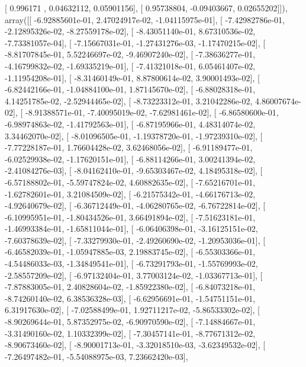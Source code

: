 \documentclass{article}
\begin{document}
       [ 0.996171  ,  0.04632112,  0.05901156],
       [ 0.95738804, -0.09403667,  0.02655202]]), array([[ -6.92885601e-01,   2.47024917e-02,  -1.04115975e-01],
       [ -7.42982786e-01,  -2.12895326e-02,  -8.27559178e-02],
       [ -8.43051140e-01,   8.67310536e-02,  -7.73381057e-04],
       [ -7.15667031e-01,  -1.27431276e-03,  -1.17470215e-02],
       [ -8.81707845e-01,   5.52246697e-02,  -9.46907240e-02],
       [ -7.38636277e-01,  -4.16799832e-02,  -1.69335219e-01],
       [ -7.41321018e-01,   6.05461407e-02,  -1.11954208e-01],
       [ -8.31460149e-01,   8.87800614e-02,   3.90001493e-02],
       [ -6.82442166e-01,  -1.04884100e-01,   1.87145670e-02],
       [ -6.88028318e-01,   4.14251785e-02,  -2.52944465e-02],
       [ -8.73223312e-01,   3.21042286e-02,   4.86007674e-02],
       [ -8.91388571e-01,  -7.40095019e-02,  -7.62981461e-02],
       [ -6.86580600e-01,  -6.98974863e-02,  -1.41792563e-01],
       [ -6.87195966e-01,   4.48314074e-02,   3.34462070e-02],
       [ -8.01096505e-01,  -1.19378720e-01,  -1.97239310e-02],
       [ -7.77228187e-01,   1.76604428e-02,   3.62468056e-02],
       [ -6.91189477e-01,  -6.02529938e-02,  -1.17620151e-01],
       [ -6.88114266e-01,   3.00241394e-02,  -2.41084276e-03],
       [ -8.04162410e-01,  -9.65303467e-02,   4.18495318e-02],
       [ -6.57188802e-01,  -5.59747824e-02,   4.60882635e-02],
       [ -7.65216701e-01,  -1.62782601e-01,   3.21084509e-02],
       [ -6.21575342e-01,  -4.66176713e-02,  -4.92640679e-02],
       [ -6.36712449e-01,  -4.06280765e-02,  -6.76722814e-02],
       [ -6.10995951e-01,  -1.80434526e-01,   3.66491894e-02],
       [ -7.51623181e-01,  -1.46993384e-01,  -1.65811044e-01],
       [ -6.06406398e-01,  -3.16125151e-02,  -7.60378639e-02],
       [ -7.33279930e-01,  -2.49260690e-02,  -1.20953036e-01],
       [ -6.46582039e-01,  -1.05947885e-03,   2.19883745e-02],
       [ -6.55303366e-01,  -4.54486033e-03,  -1.34849541e-01],
       [ -6.73291793e-01,  -1.55769993e-02,  -2.58557209e-02],
       [ -6.97132404e-01,   3.77003124e-02,  -1.03367713e-01],
       [ -7.87883005e-01,   2.40828604e-02,  -1.85922380e-02],
       [ -6.84073218e-01,  -8.74260140e-02,   6.38536328e-03],
       [ -6.62956691e-01,  -1.54751151e-01,   6.31917630e-02],
       [ -7.02588499e-01,   1.92711217e-02,  -5.86533302e-02],
       [ -8.90269644e-01,   5.87352975e-02,  -6.90970590e-02],
       [ -7.14884667e-01,  -3.31490160e-02,   1.10332399e-02],
       [ -7.30457141e-01,  -8.77671312e-02,  -8.90673460e-02],
       [ -8.90001713e-01,  -3.32018510e-03,  -3.62349532e-02],
       [ -7.26497482e-01,  -5.54088975e-03,   7.23662420e-03],
\end{document}
